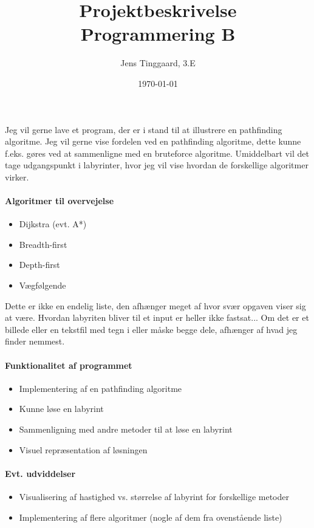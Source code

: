 \documentclass[a4paper, 12pt]{article}
\title{%
Projektbeskrivelse \\
\large Programmering B
}
\author{Jens Tinggaard, 3.E}
\date{\today}
\begin{document}
    \maketitle

    Jeg vil gerne lave et program, der er i stand til at illustrere en pathfinding algoritme. Jeg vil gerne vise fordelen ved en pathfinding algoritme, dette kunne f.eks. gøres ved at sammenligne med en bruteforce algoritme. Umiddelbart vil det tage udgangspunkt i labyrinter, hvor jeg vil vise hvordan de forskellige algoritmer virker.
    \paragraph{Algoritmer til overvejelse}
    \begin{itemize}
        \item Dijkstra (evt. A*)
        \item Breadth-first
        \item Depth-first
        \item Vægfølgende
    \end{itemize}
    Dette er ikke en endelig liste, den afhænger meget af hvor svær opgaven viser sig at være. Hvordan labyriten bliver til et input er heller ikke fastsat... Om det er et billede eller en tekstfil med tegn i eller måske begge dele, afhænger af hvad jeg finder nemmest.

    \paragraph{Funktionalitet af programmet}
    \begin{itemize}
        \item Implementering af en pathfinding algoritme
        \item Kunne løse en labyrint
        \item Sammenligning med andre metoder til at løse en labyrint
        \item Visuel repræsentation af løsningen
    \end{itemize}

    \paragraph{Evt. udviddelser}
    \begin{itemize}
        \item Visualisering af hastighed vs. størrelse af labyrint for forskellige metoder
        \item Implementering af flere algoritmer (nogle af dem fra ovenstående liste)
    \end{itemize}
\end{document}
